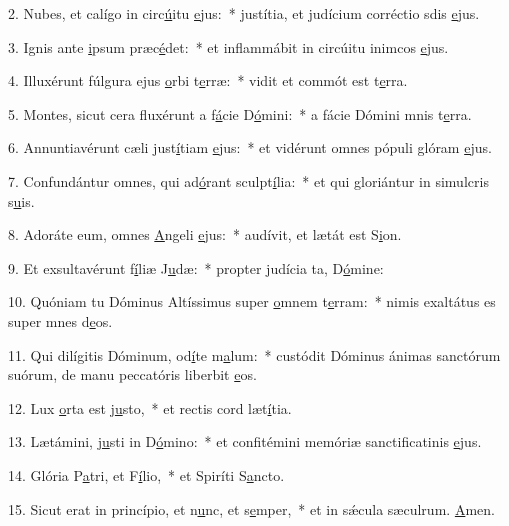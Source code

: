 2. Nubes, et calígo in circ\uline{ú}itu \uline{e}jus:~* justítia, et judícium corréctio sdis \uline{e}jus.\par 
3. Ignis ante \uline{i}psum præc\uline{é}det:~* et inflammábit in circúitu inimcos \uline{e}jus.\par 
4. Illuxérunt fúlgura ejus \uline{o}rbi t\uline{e}rræ:~* vidit et commót est t\uline{e}rra.\par 
5. Montes, sicut cera fluxérunt a f\uline{á}cie D\uline{ó}mini:~* a fácie Dómini mnis t\uline{e}rra.\par 
6. Annuntiavérunt cæli just\uline{í}tiam \uline{e}jus:~* et vidérunt omnes pópuli glóram \uline{e}jus.\par 
7. Confundántur omnes, qui ad\uline{ó}rant sculpt\uline{í}lia:~* et qui gloriántur in simulcris s\uline{u}is.\par 
8. Adoráte eum, omnes \uline{A}ngeli \uline{e}jus:~* audívit, et lætát est S\uline{i}on.\par 
9. Et exsultavérunt f\uline{í}liæ J\uline{u}dæ:~* propter judícia ta, D\uline{ó}mine:\par 
10. Quóniam tu Dóminus Altíssimus super \uline{o}mnem t\uline{e}rram:~* nimis exaltátus es super mnes d\uline{e}os.\par 
11. Qui dilígitis Dóminum, od\uline{í}te m\uline{a}lum:~* custódit Dóminus ánimas sanctórum suórum, de manu peccatóris liberbit \uline{e}os.\par 
12. Lux \uline{o}rta est j\uline{u}sto,~* et rectis cord læt\uline{í}tia.\par 
13. Lætámini, j\uline{u}sti in D\uline{ó}mino:~* et confitémini memóriæ sanctificatinis \uline{e}jus.\par 
14. Glória P\uline{a}tri, et F\uline{í}lio,~* et Spiríti S\uline{a}ncto.\par 
15. Sicut erat in princípio, et n\uline{u}nc, et s\uline{e}mper,~* et in sǽcula sæculrum. \uline{A}men.\par 
